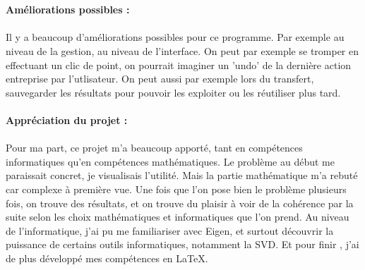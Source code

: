 \documentclass[a4paper,11pt,fleqn]{report}
\begin{document}
	\\\\
	\textbf{Am\'eliorations possibles :}\\\\
	Il y a beaucoup d'am\'eliorations possibles pour ce programme. Par exemple au niveau de la gestion, au niveau de l'interface. On peut par exemple se tromper en effectuant un clic de point, on pourrait imaginer un 'undo' de la derni\`ere action entreprise par l'utlisateur.
	On peut aussi par exemple lors du transfert, sauvegarder les r\'esultats pour pouvoir les exploiter ou les r\'eutiliser plus tard.
	\\
	\\
	\textbf{Appr\'eciation du projet :}\\\\
	Pour ma part, ce projet m'a beaucoup apport\'e, tant en comp\'etences informatiques qu'en comp\'etences math\'ematiques. Le probl\`eme au d\'ebut me paraissait concret, je visualisais l'utilit\'e. Mais la partie math\'ematique m'a rebut\'e car complexe \`a premi\`ere vue. Une fois que l'on pose bien le probl\`eme plusieurs fois, on trouve des r\'esultats, et on trouve du plaisir \`a voir de la coh\'erence par la suite selon les choix math\'ematiques et informatiques que l'on prend. Au niveau de l'informatique, j'ai pu me familiariser avec Eigen, et surtout d\'ecouvrir la puissance de certains outils informatiques, notamment la SVD. Et pour finir , j'ai de plus d\'evelopp\'e mes comp\'etences en \LaTeX.
	
	
\end{document}

